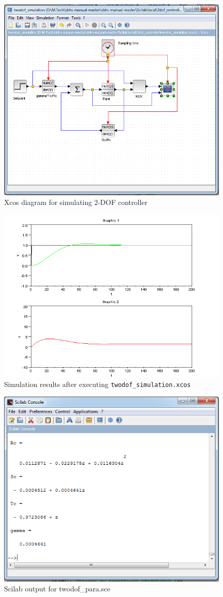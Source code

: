 \begin{figure}
\centering
\includegraphics[width=0.8\linewidth]{2-DOF_manual/2dof-sim-xcos}
\caption{Xcos diagram for simulating 2-DOF controller}
\label{2dof-sim-xcos}
\end{figure}

\begin{figure}
\centering
\includegraphics[width=0.8\linewidth]{2-DOF_manual/2dof-sim-result}
\caption{Simulation results after executing  {\tt twodof\_simulation.xcos}}
\label{2dof-sim-res}
\end{figure}
\begin{figure}
\centering
\includegraphics[width=0.8\linewidth]{2-DOF_manual/sci-console}
\caption{Scilab output for \ttfamily twodof\_para.sce}
\label{2dof-para-out}
\end{figure}

